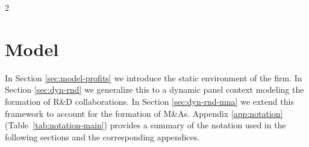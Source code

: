 \documentclass[12pt]{article}
\begin{document}
\begin{spacing}{2}
\section{Model}
\label{sec:model}
In Section \ref{sec:model-profits} we introduce the static environment of the firm. In Section \ref{sec:dyn-rnd} we generalize this to a dynamic panel context modeling the formation of R\&D collaborations. In Section \ref{sec:dyn-rnd-mna} we extend this framework to  account for the formation of M\&As. Appendix \ref{app:notation}  (Table~\ref{tab:notation-main}) provides a summary of the notation used in the following sections and the corresponding appendices.


\end{spacing}
\end{document}
